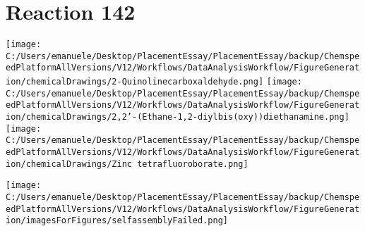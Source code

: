 \documentclass{article}%
\begin{document}
\section*{Reaction 142}%
%
\begin{scheme}[H]%
\begin{minipage}{0.5\textwidth}%
\texttt{[image: C:/Users/emanuele/Desktop/PlacementEssay/PlacementEssay/backup/ChemspeedPlatformAllVersions/V12/Workflows/DataAnalysisWorkflow/FigureGeneration/chemicalDrawings/2-Quinolinecarboxaldehyde.png]}%
\texttt{[image: C:/Users/emanuele/Desktop/PlacementEssay/PlacementEssay/backup/ChemspeedPlatformAllVersions/V12/Workflows/DataAnalysisWorkflow/FigureGeneration/chemicalDrawings/2,2'-(Ethane-1,2-diylbis(oxy))diethanamine.png]}%
\texttt{[image: C:/Users/emanuele/Desktop/PlacementEssay/PlacementEssay/backup/ChemspeedPlatformAllVersions/V12/Workflows/DataAnalysisWorkflow/FigureGeneration/chemicalDrawings/Zinc tetrafluoroborate.png]}%
\end{minipage}%
\begin{minipage}{0.5\textwidth}%
\begin{center}%
\texttt{[image: C:/Users/emanuele/Desktop/PlacementEssay/PlacementEssay/backup/ChemspeedPlatformAllVersions/V12/Workflows/DataAnalysisWorkflow/FigureGeneration/imagesForFigures/selfassemblyFailed.png]}%
\end{center}%
\end{minipage}%
\caption{Self-assembly of components 4, 19, with Zinc(II) in a 3.0:1.5:1.0 molar ratio in CH$_3$CN at 60\textdegree C for 40h. These are the reagents (starting materials) for reaction 142.}%
\end{scheme}%
\end{document}
